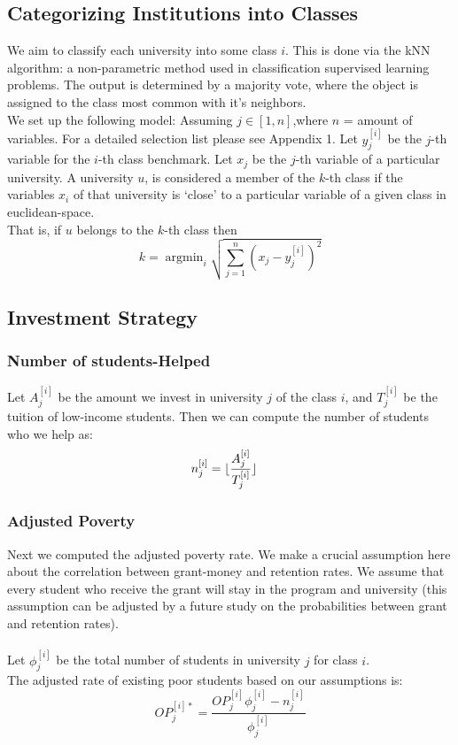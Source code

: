 \documentclass[12pt]{scrartcl}
\DeclarePairedDelimiter\floor{\lfloor}{\rfloor}
\newcommand{\argmin}{\mathop{\mathrm{argmin}}}
\begin{document}
	\subsection{Categorizing Institutions into Classes}
		We aim to classify each university into some class $i$. This is done via the kNN algorithm: a non-parametric method used in classification supervised learning problems. The output is determined by a majority vote, where the object is assigned to the class most common with it's neighbors. \cite{Hastie}\\
		We set up the following model:
		Assuming $j\in [1,n]$,where $n$ = amount of variables. For a detailed selection list please see Appendix 1. Let $y_j^{[i]}$ be the $j$-th variable for the $i$-th class benchmark. Let $x_j$ be the $j$-th variable of a particular university. A university $u$, is considered a member of the $k$-th class if the variables $x_i$ of that university is `close' to a particular variable of a given class in euclidean-space.\\
	
		That is, if $u$ belongs to the $k$-th class then
		$$
			k = \argmin_{i} \sqrt{ \sum_{j=1}^n (x_j-y_j^{[i]})^2 }
		$$

	
	\subsection{Investment Strategy}

	\subsubsection{Number of students-Helped}
		Let $A_j^{[i]}$ be the amount we invest in university $j$ of the class $i$, and $T_j^{[i]}$ be the tuition of low-income students. Then we can compute the number of students who we help as:
		\begin{align}
			n_j^{[i]} &= \floor{\frac{A_j^{[i]}}{T_j^{[i]}}}
		\end{align}

	\subsubsection{Adjusted Poverty}
		Next we computed the adjusted poverty rate. We make a crucial assumption here about the correlation between grant-money and retention rates. We assume that every student who receive the grant will stay in the program and university (this assumption can be adjusted by a future study on the probabilities between grant and retention rates).\\
		\\
		Let $\phi_j^{[i]}$ be the total number of students in university $j$ for class $i$.\\
		The adjusted rate of existing poor students based on our assumptions is:
		\begin{equation}
			OP_j^{[i]*} = \frac{  OP_j^{[i]}\phi_j^{[i]}-n_j^{[i]}  }{ \phi_j^{[i]}  }
		\end{equation}
		
\end{document}
